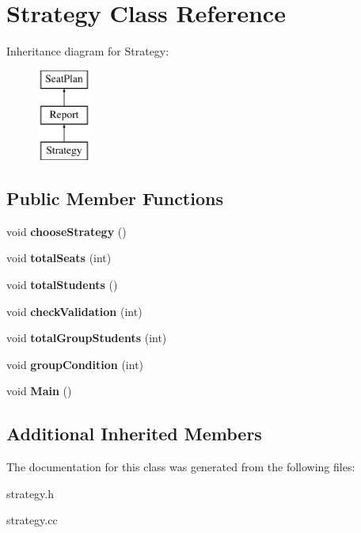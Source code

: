 \hypertarget{classStrategy}{\section{Strategy Class Reference}
\label{classStrategy}
}
Inheritance diagram for Strategy\-:\begin{figure}[H]
\begin{center}
\leavevmode
\includegraphics[height=3.000000cm]{classStrategy}
\end{center}
\end{figure}
\subsection*{Public Member Functions}
\begin{DoxyCompactItemize}
\item 
\hypertarget{classStrategy_a1a81ab4bb7e44d8bd9a96ddc1d7c2be8}{void {\bfseries choose\-Strategy} ()}\label{classStrategy_a1a81ab4bb7e44d8bd9a96ddc1d7c2be8}

\item 
\hypertarget{classStrategy_abbeb9baaf7af96813941d17b21ff0045}{void {\bfseries total\-Seats} (int)}\label{classStrategy_abbeb9baaf7af96813941d17b21ff0045}

\item 
\hypertarget{classStrategy_a4303160d0492974f8f92f659085586e4}{void {\bfseries total\-Students} ()}\label{classStrategy_a4303160d0492974f8f92f659085586e4}

\item 
\hypertarget{classStrategy_a6849a678a8198d0b3c1837a49ce3fc3e}{void {\bfseries check\-Validation} (int)}\label{classStrategy_a6849a678a8198d0b3c1837a49ce3fc3e}

\item 
\hypertarget{classStrategy_ac2dd78118c6bd786e8b2bd1e37237202}{void {\bfseries total\-Group\-Students} (int)}\label{classStrategy_ac2dd78118c6bd786e8b2bd1e37237202}

\item 
\hypertarget{classStrategy_a67f419e227903badcacffde2dd725761}{void {\bfseries group\-Condition} (int)}\label{classStrategy_a67f419e227903badcacffde2dd725761}

\item 
\hypertarget{classStrategy_a795aec6d20e2f2d94c0a0c42f62d9c84}{void {\bfseries Main} ()}\label{classStrategy_a795aec6d20e2f2d94c0a0c42f62d9c84}

\end{DoxyCompactItemize}
\subsection*{Additional Inherited Members}


The documentation for this class was generated from the following files\-:\begin{DoxyCompactItemize}
\item 
strategy.\-h\item 
strategy.\-cc\end{DoxyCompactItemize}
